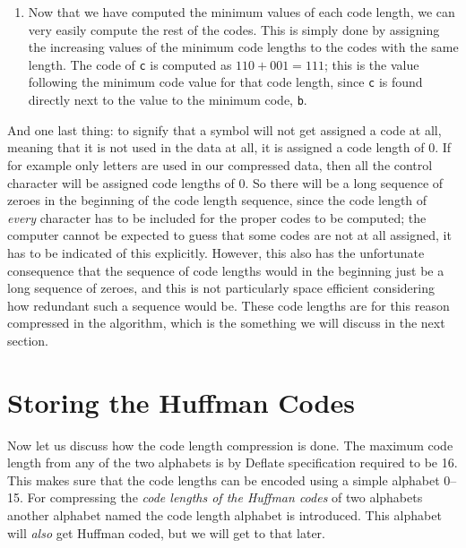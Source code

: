 \begin{enumerate}
\begin{algorithm}[H]
\begin{algorithmic}[1]

      \EndWhile
    \end{algorithmic}
  \end{algorithm}

\item Now that we have computed the minimum values of each code
  length, we can very easily compute the rest of the codes. This is
  simply done by assigning the increasing values of the minimum code
  lengths to the codes with the same length. The code of \texttt{c} is
  computed as $110 + 001 = 111$; this is the value following the
  minimum code value for that code length, since \texttt{c} is found
  directly next to the value to the minimum code, \texttt{b}.

\end{enumerate}

And one last thing: to signify that a symbol will not get assigned a
code at all, meaning that it is not used in the data at all, it is
assigned a code length of $0$. If for example only \ascii letters are
used in our compressed data, then all the control character will be
assigned code lengths of $0$. So there will be a long sequence of
zeroes in the beginning of the code length sequence, since the code
length of \textit{every} character has to be included for the proper
codes to be computed; the computer cannot be expected to guess that
some codes are not at all assigned, it has to be indicated of this
explicitly. However, this also has the unfortunate consequence that
the sequence of code lengths would in the beginning just be a long
sequence of zeroes, and this is not particularly space efficient
considering how redundant such a sequence would be. These code lengths
are for this reason compressed in the  algorithm, which is the
something we will discuss in the next section.

\section{Storing the Huffman Codes}
\label{sec:storing-huffman-codes}

Now let us discuss how the code length compression is done. The
maximum code length from any of the two alphabets is by Deflate
specification required to be 16. This makes sure that the code lengths
can be encoded using a simple alphabet 0--15. For compressing the
\textit{code lengths of the Huffman codes} of two alphabets another
alphabet named the code length alphabet is introduced. This alphabet
will \textit{also} get Huffman coded, but we will get to that later.

